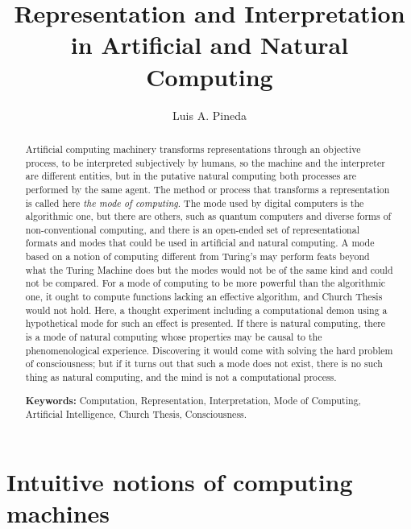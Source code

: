 \documentclass[11pt]{article}
\title{Representation and Interpretation in Artificial and Natural Computing}
\author[1,*]{Luis A. Pineda}
\affil[1]{Universidad Nacional Aut\'onoma de M\'exico, IIMAS, Mexico City, 04510, Mexico}
\affil[*]{lpineda@unam.mx}
\date{}
\begin{document}
\maketitle
\begin{abstract}
    \noindent
Artificial computing machinery transforms representations through an objective process, to be interpreted subjectively by humans, so the machine and the interpreter are different entities, but in the putative natural computing both processes are performed by the same agent. The method or process that transforms a representation is called here \emph{the mode of computing}. The mode used by digital computers is the algorithmic one, but there are others, such as quantum computers and diverse forms of non-conventional computing, and there is an open-ended set of representational formats and modes that could be used in artificial and natural computing. A mode based on a notion of computing different from Turing's may perform feats beyond what the Turing Machine does but the modes would not be of the same kind and could not be compared. For a mode of computing to be more powerful than the algorithmic one, it ought to compute functions lacking an effective algorithm, and Church Thesis would not hold. Here, a thought experiment including a computational demon using a hypothetical mode for such an effect is presented. If there is natural computing, there is a mode of natural computing whose properties may be causal to the phenomenological experience. Discovering it would come with solving the hard problem of consciousness; but if it turns out that such a mode does not exist, there is no such thing as natural computing, and the mind is not a computational process.
    
    \smallskip
    \noindent\textbf{Keywords:} Computation, Representation, Interpretation, Mode of Computing, Artificial Intelligence, Church Thesis, Consciousness.
\end{abstract}

\flushbottom


\section{Intuitive notions of computing machines}
\label{sec:introduction}
\end{document}
